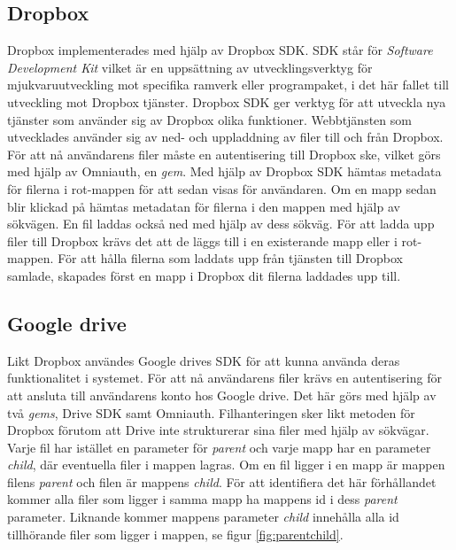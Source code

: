 \subsection{Dropbox}
Dropbox implementerades med hjälp av Dropbox SDK. SDK står för \textit{Software Development Kit} vilket är en uppsättning av utvecklingsverktyg för mjukvaruutveckling mot specifika ramverk eller programpaket, i det här fallet till utveckling mot Dropbox tjänster. Dropbox SDK ger verktyg för att utveckla nya tjänster som använder sig av Dropbox olika funktioner. Webbtjänsten som utvecklades använder sig av ned- och uppladdning av filer till och från Dropbox. För att nå användarens filer måste en autentisering till Dropbox ske, vilket görs med hjälp av Omniauth, en \textit{gem}. Med hjälp av Dropbox SDK hämtas metadata för filerna i rot-mappen för att sedan visas för användaren. Om en mapp sedan blir klickad på hämtas metadatan för filerna i den mappen med hjälp av sökvägen. En fil laddas också ned med hjälp av dess sökväg. För att ladda upp filer till Dropbox krävs det att de läggs till i en existerande mapp eller i rot-mappen. För att hålla filerna som laddats upp från tjänsten till Dropbox samlade, skapades först en mapp i Dropbox dit filerna laddades upp till.

\subsection{Google drive}
Likt Dropbox användes Google drives SDK för att kunna använda deras funktionalitet i systemet. För att nå användarens filer krävs en autentisering för att ansluta till användarens konto hos Google drive. Det här görs med hjälp av två \textit{gems}, Drive SDK samt Omniauth. Filhanteringen sker likt metoden för Dropbox förutom att Drive inte strukturerar sina filer med hjälp av sökvägar. Varje fil har istället en parameter för \textit{parent} och varje mapp har en parameter \textit{child}, där eventuella filer i mappen lagras. Om en fil ligger i en mapp är mappen filens \textit{parent} och filen är mappens \textit{child}. För att identifiera det här förhållandet kommer alla filer som ligger i samma mapp ha mappens id i dess \textit{parent} parameter. Liknande kommer mappens parameter \textit{child} innehålla alla id tillhörande filer som ligger i mappen, se figur \ref{fig:parentchild}.

